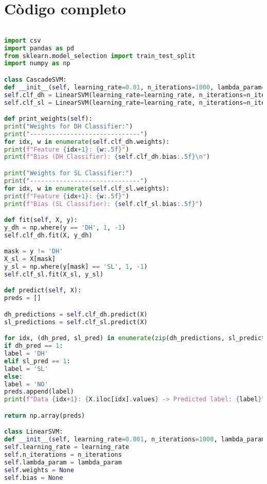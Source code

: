 \documentclass[12pt]{article}
\begin{document}
\clearpage

\vspace{1cm}\vspace{1cm}


\section{Còdigo completo}

\begin{lstlisting}[language=Python]

import csv
import pandas as pd
from sklearn.model_selection import train_test_split
import numpy as np

class CascadeSVM:
def __init__(self, learning_rate=0.01, n_iterations=1000, lambda_param=0.1):
self.clf_dh = LinearSVM(learning_rate=learning_rate, n_iterations=n_iterations, lambda_param=lambda_param)
self.clf_sl = LinearSVM(learning_rate=learning_rate, n_iterations=n_iterations, lambda_param=lambda_param)

def print_weights(self):
print("Weights for DH Classifier:")
print("------------------------------")
for idx, w in enumerate(self.clf_dh.weights):
print(f"Feature {idx+1}: {w:.5f}")
print(f"Bias (DH Classifier): {self.clf_dh.bias:.5f}\n")

print("Weights for SL Classifier:")
print("------------------------------")
for idx, w in enumerate(self.clf_sl.weights):
print(f"Feature {idx+1}: {w:.5f}")
print(f"Bias (SL Classifier): {self.clf_sl.bias:.5f}")

def fit(self, X, y):
y_dh = np.where(y == 'DH', 1, -1)
self.clf_dh.fit(X, y_dh)

mask = y != 'DH'
X_sl = X[mask]
y_sl = np.where(y[mask] == 'SL', 1, -1)
self.clf_sl.fit(X_sl, y_sl)

def predict(self, X):
preds = []

dh_predictions = self.clf_dh.predict(X)
sl_predictions = self.clf_sl.predict(X)

for idx, (dh_pred, sl_pred) in enumerate(zip(dh_predictions, sl_predictions)):
if dh_pred == 1:
label = 'DH'
elif sl_pred == 1:
label = 'SL'
else:
label = 'NO'
preds.append(label)
print(f"Data {idx+1}: {X.iloc[idx].values} -> Predicted label: {label}")

return np.array(preds)

class LinearSVM:
def __init__(self, learning_rate=0.001, n_iterations=1000, lambda_param=0.1):
self.learning_rate = learning_rate
self.n_iterations = n_iterations
self.lambda_param = lambda_param
self.weights = None
self.bias = None


\end{lstlisting}
\end{document}
